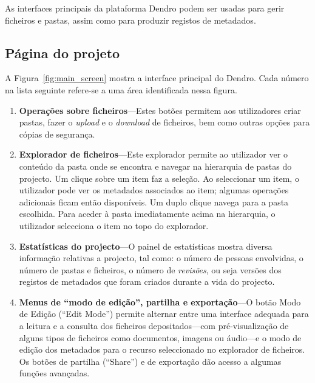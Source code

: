 \documentclass[paper=a4, fontsize=11pt]{scrartcl} %
\numberwithin{equation}{section} %
\numberwithin{figure}{section} %
\numberwithin{table}{section} %
\begin{document}
As interfaces principais da plataforma Dendro podem ser usadas para gerir ficheiros e pastas, assim como para produzir registos de metadados.

\subsection{Página do projeto} %
\label{sub:project_home_screen}

A Figura~\ref{fig:main_screen} mostra a interface principal do Dendro. Cada número na lista seguinte refere-se a uma área identificada nessa figura.

\begin{enumerate}
	\item \textbf{Operações sobre ficheiros}---Estes botões permitem aos utilizadores criar pastas, fazer o \emph{upload} e o \emph{download} de ficheiros, bem como outras opções para cópias de segurança.
	
	\item \textbf{Explorador de ficheiros}---Este explorador permite ao utilizador ver o conteúdo da pasta onde se encontra e navegar na hierarquia de pastas do projecto. Um clique sobre um item faz a seleção. Ao seleccionar um item, o utilizador pode ver os metadados  associados ao item; algumas operações adicionais ficam então disponíveis. Um duplo clique navega para a pasta escolhida. Para aceder à pasta imediatamente acima na hierarquia, o utilizador  selecciona o item no topo do explorador.
	
	\item \textbf{Estatísticas do projecto}---O painel de estatísticas mostra diversa informação relativas a projecto, tal como: o número de pessoas envolvidas, o número de pastas e ficheiros, o número de \emph{revisões}, ou seja versões dos registos de metadados que foram criados durante a vida do projecto. 
		
	\item \textbf{Menus de ``modo de edição'', partilha e exportação}---O botão Modo de Edição (``Edit Mode'') permite alternar entre uma interface adequada para a leitura e a consulta dos ficheiros depositados---com pré-visualização de alguns tipos de ficheiros como documentos, imagens ou áudio---e o modo de edição dos metadados para o recurso seleccionado no explorador de ficheiros. Os botões de partilha (``Share'') e de exportação dão acesso a algumas funções avançadas.
\end{enumerate}
\end{document}
